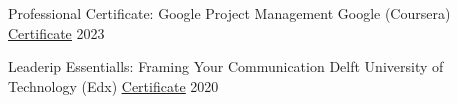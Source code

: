 

\begin{cvhonors}

  \cvhonor
    {Professional Certificate: Google Project Management} %
    {Google (Coursera)} %
    {\underline{\href{https://www.coursera.org/account/accomplishments/professional-cert/4Z4V7RJ4XDGQ}{\faExternalLink* Certificate}}} %
    {2023} %

  \cvhonor
    {Leaderip Essentialls: Framing Your Communication} %
    {Delft University of Technology (Edx)} %
    {\underline{\href{https://courses.edx.org/certificates/0ff36d334bb7485f8ed83c538d352e94}{\faExternalLink* Certificate}}} %
    {2020} %

\end{cvhonors}
